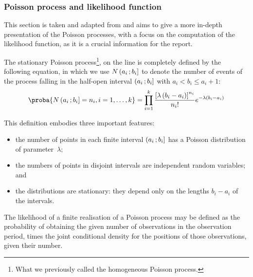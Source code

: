 \subsubsection{Poisson process and likelihood function}

This section is taken and adapted from \citep[chap.~2, p.~19-23]{daley2003introduction} and aims to give a more in-depth presentation of the Poisson processes, with a focus on the computation of the likelihood function, as it is a crucial information for the report.

The stationary Poisson process\footnote{What we previously called the homogeneous Poisson process.}, on the line is completely defined by the following equation, in which we use $N\left( a_i \, ; b_i \right]$ to denote the number of events of the process falling in the half-open interval $\left( a_i \, ; b_i \right]$ with $a_i < b_i \leq a_i+1$:
\begin{equation}\label{eq:def_stationary_pp}
    \proba{N\intervalleOF{a_i}{b_i} = n_i, i=1,\dots,k} = \prod_{i=1}^k \frac{\bracks{\lambda\pars{b_i-a_i}}^{n_i}}{n_i!}e^{-\lambda\pars{b_i-a_i}}
\end{equation}

This definition embodies three important features:
\begin{itemize}
    \item the number of points in each finite interval $\left( a_i \, ; b_i \right]$ has a Poisson distribution of parameter~$\lambda$;
    
    \item the numbers of points in disjoint intervals are independent random variables; and
    
    \item the distributions are stationary: they depend only on the lengths $b_i - a_i$ of the intervals.
\end{itemize}

The likelihood of a finite realisation of a Poisson process may be defined as the probability of obtaining the given number of observations in the observation period, times the joint conditional density for the positions of those observations, given their number.

